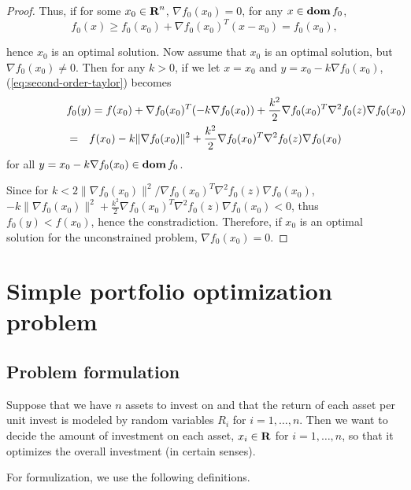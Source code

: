 \documentclass[11pt, oneside]{article}   	%
\newcommand{\grad}{\nabla}
\begin{document}
\begin{itemize}
\begin{proof}
Thus, if for some $x_0 \in {\mbox{\bf R}}^n$, $\grad f_0(x_0) = 0$, for any $x\in\mathop{\bf dom} f_0$,
\begin{equation}
f_0(x) \geq f_0(x_0) + \grad f_0(x_0) ^T (x-x_0) = f_0(x_0),
\end{equation}

hence $x_0$ is an optimal solution.
Now assume that $x_0$ is an optimal solution, but $\grad f_0(x_0) \neq 0$.
Then for any $k>0$, if we let $x=x_0$ and $y = x_0 - k \grad f_0(x_0) $,
(\ref{eq:second-order-taylor}) becomes
\begin{eqnarray*}
\lefteqn{
f_0(y) = f(x_0) + \grad f_0(x_0) ^T (-k \grad f_0(x_0)) + \frac{k^2}{2} \grad f_0(x_0) ^T \grad^2 f_0(z) \grad f_0(x_0)
}
\\
&=&
f(x_0) - k \|\grad f_0(x_0)\|^2 + \frac{k^2}{2} \grad f_0(x_0) ^T \grad^2 f_0(z) \grad f_0(x_0)
\end{eqnarray*}
for all $y = x_0 - k \grad f_0(x_0) \in \dom f_0$.

Since for $k< 2 \|\grad f_0(x_0)\|^2 / \grad f_0(x_0) ^T \grad^2 f_0(z) \grad f_0(x_0)$,
$-k \|\grad f_0(x_0)\|^2 + \frac{k^2}{2} \grad f_0(x_0) ^T \grad^2 f_0(z) \grad f_0(x_0) < 0$,
thus
$f_0(y) < f(x_0)$,
hence the constradiction.
Therefore, if $x_0$ is an optimal solution for the unconstrained problem, $\grad f_0(x_0) = 0$.

\end{proof}
\end{itemize}


\newpage
\section{Simple portfolio optimization problem}

\subsection{Problem formulation}

Suppose that we have $n$ assets to invest on
and that the return of each asset per unit invest is modeled by random variables $R_i$ for $i=1,\ldots,n$.
Then we want to decide the amount of investment on each asset, $x_i\in{\mbox{\bf R}}$ for $i=1,\ldots,n$,
so that it optimizes the overall investment (in certain senses).

For formulization, we use the following definitions.
\end{document}
